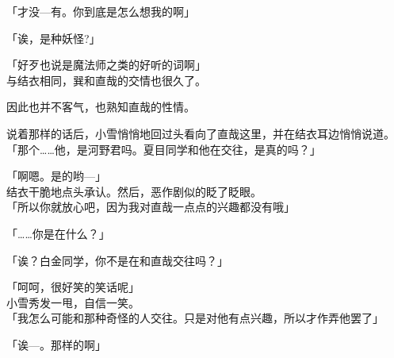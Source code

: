 「才没—有。你到底是怎么想我的啊」

「诶，是种妖怪?」

「好歹也说是魔法师之类的好听的词啊」\\

与结衣相同，巽和直哉的交情也很久了。

因此也并不客气，也熟知直哉的性情。

说着那样的话后，小雪悄悄地回过头看向了直哉这里，并在结衣耳边悄悄说道。\\

「那个……他，是河野君吗。夏目同学和他在交往，是真的吗？」

「啊嗯。是的哟—」\\

结衣干脆地点头承认。然后，恶作剧似的眨了眨眼。\\

「所以你就放心吧，因为我对直哉一点点的兴趣都没有哦」

「……你是在什么？」

「诶？白金同学，你不是在和直哉交往吗？」

「呵呵，很好笑的笑话呢」\\

小雪秀发一甩，自信一笑。\\

「我怎么可能和那种奇怪的人交往。只是对他有点兴趣，所以才作弄他罢了」

「诶—。那样的啊」\\

